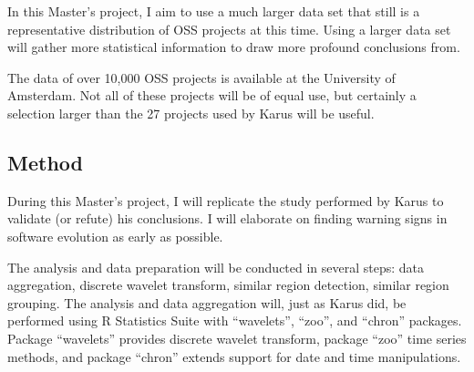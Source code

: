In this Master's project, I aim to use a much larger data set that still is a
representative distribution of OSS projects at this time. Using a larger data
set will gather more statistical information to draw more profound conclusions
from.

The data of over 10,000 OSS projects is available at the University of
Amsterdam. Not all of these projects will be of equal use, but certainly a
selection larger than the 27 projects used by Karus will be useful.

\subsection{Method}
During this Master's project, I will replicate the study performed by Karus to
validate (or refute) his conclusions. I will elaborate on finding warning signs
in software evolution as early as possible.

The analysis and data preparation will be conducted in several steps: data
aggregation, discrete wavelet transform, similar region detection, similar
region grouping. The analysis and data aggregation will, just as Karus did, be
performed using R Statistics Suite with ``wavelets'', ``zoo'', and ``chron''
packages. Package ``wavelets'' provides discrete wavelet transform, package
``zoo'' time series methods, and package ``chron'' extends support for date and
time manipulations.

